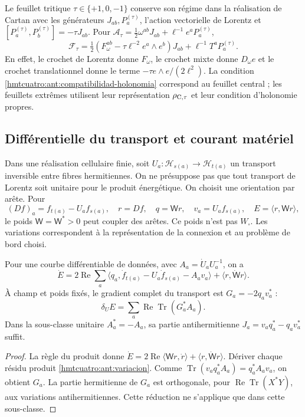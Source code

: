 Le feuillet tritique \(\tau\in\{+1,0,-1\}\) conserve son régime dans la réalisation de Cartan avec les générateurs \(J_{ab},P_a^{(\tau)}\), l’action vectorielle de Lorentz et \([P_a^{(\tau)},P_b^{(\tau)}]=-\tau J_{ab}\). Pour \(\mathcal A_\tau=\frac12\omega^{ab}J_{ab}+\ell^{-1}e^aP_a^{(\tau)}\),
\[
 \mathcal F_\tau=
 \tfrac12(F_\omega^{ab}-\tau\ell^{-2}e^a\wedge e^b)J_{ab}
 +\ell^{-1}T^aP_a^{(\tau)} .
\]
En effet, le crochet de Lorentz donne \(F_\omega\), le crochet mixte donne \(D_\omega e\) et le crochet translationnel donne le terme \(-\tau e\wedge e/(2\ell^2)\). La condition \eqref{hmtcuatro:ant:compatibilidad-holonomia} correspond au feuillet central ; les feuillets extrêmes utilisent leur représentation \(\rho_{{\rm C},\tau}\) et leur condition d’holonomie propres.

\subsection{Différentielle du transport et courant matériel}
\label{hmtcuatro:ant:corriente-transporte}

Dans une réalisation cellulaire finie, soit \(U_a:\mathcal H_{s(a)}\to\mathcal H_{t(a)}\) un transport inversible entre fibres hermitiennes. On ne présuppose pas que tout transport de Lorentz soit unitaire pour le produit énergétique. On choisit une orientation par arête. Pour
\[
 (Df)_a=f_{t(a)}-U_af_{s(a)},\quad r=Df,\quad
 q=\mathsf W r,\quad v_a=U_af_{s(a)},\quad
 E=\langle r,\mathsf W r\rangle ,
\]
le poids \(\mathsf W=\mathsf W^*>0\) peut coupler des arêtes. Ce poids n’est pas \(W_\square\). Les variations correspondent à la représentation de la connexion et au problème de bord choisi.

\begin{proposition}
\label{hmtcuatro:ant:variacion-completa} Pour une courbe différentiable de données, avec \(A_a=\dot U_aU_a^{-1}\), on a
\begin{equation}
 \dot E=2\operatorname{Re}\sum_a
 \langle q_a,\dot f_{t(a)}-U_a\dot f_{s(a)}-A_av_a\rangle
 +\langle r,\dot{\mathsf W}r\rangle .
 \label{hmtcuatro:ant:variacion}
\end{equation}
À champ et poids fixés, le gradient complet du transport est \(G_a=-2q_av_a^*\) :
\[
 \delta_U E=\sum_a\operatorname{Re}\operatorname{Tr}(G_a^*A_a).
\]
Dans la sous-classe unitaire \(A_a^*=-A_a\), sa partie antihermitienne \(J_a=v_aq_a^*-q_av_a^*\) suffit.
\end{proposition}
\begin{proof}
La règle du produit donne \(\dot E=2\operatorname{Re}\langle\mathsf W r,\dot r\rangle+
\langle r,\dot{\mathsf W}r\rangle\). Dériver chaque résidu produit \eqref{hmtcuatro:ant:variacion}. Comme \(\operatorname{Tr}(v_aq_a^*A_a)=q_a^*A_av_a\), on obtient \(G_a\). La partie hermitienne de \(G_a\) est orthogonale, pour \(\operatorname{Re}\operatorname{Tr}(X^*Y)\), aux variations antihermitiennes. Cette réduction ne s’applique que dans cette sous-classe.
\end{proof}

